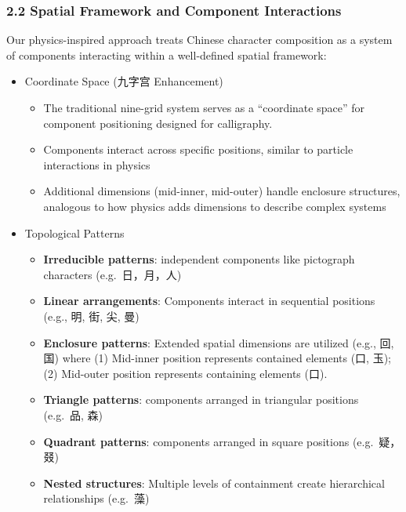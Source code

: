 \documentclass[
  11pt,
  letterpaper,
]{article}
\providecommand{\tightlist}{%
  \setlength{\itemsep}{0pt}\setlength{\parskip}{0pt}}
\begin{document}
\hypertarget{spatial-framework-and-component-interactions}{%
\subsubsection{2.2 Spatial Framework and Component
Interactions}\label{spatial-framework-and-component-interactions}}

Our physics-inspired approach treats Chinese character composition as a
system of components interacting within a well-defined spatial
framework:

\begin{itemize}
\tightlist
\item
  Coordinate Space (九字宫 Enhancement)

  \begin{itemize}
  \tightlist
  \item
    The traditional nine-grid system serves as a ``coordinate space''
    for component positioning designed for calligraphy.
  \item
    Components interact across specific positions, similar to particle
    interactions in physics
  \item
    Additional dimensions (mid-inner, mid-outer) handle enclosure
    structures, analogous to how physics adds dimensions to describe
    complex systems
  \end{itemize}
\item
  Topological Patterns

  \begin{itemize}
  \tightlist
  \item
    \textbf{Irreducible patterns}: independent components like
    pictograph characters (e.g.~日，月，人)
  \item
    \textbf{Linear arrangements}: Components interact in sequential
    positions (e.g., 明, 街, 尖, 曼)
  \item
    \textbf{Enclosure patterns}: Extended spatial dimensions are
    utilized (e.g., 回, 国) where (1) Mid-inner position represents
    contained elements (口, 玉); (2) Mid-outer position represents
    containing elements (口).
  \item
    \textbf{Triangle patterns}: components arranged in triangular
    positions (e.g.~品, 森)
  \item
    \textbf{Quadrant patterns}: components arranged in square positions
    (e.g.~疑，叕)
  \item
    \textbf{Nested structures}: Multiple levels of containment create
    hierarchical relationships (e.g.~藻)
  \end{itemize}
\end{itemize}
\end{document}
